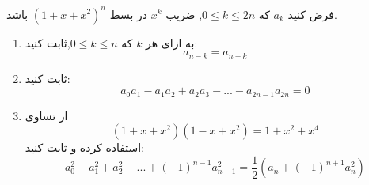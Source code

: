     \p
    فرض کنید 
	$a_k$
	كه
	$0 \leq k \leq 2n$,
	 ضریب 
	 $x^k$ در بسط $(1 + x + x^2)^n$ باشد.
	\begin{enumerate}
        \item
    	به ازای هر $k$
		كه
		$0 \leq k \leq n$,ثابت کنید:
		 $$a_{n-k} = a_{n+k}$$
    	\item
    	ثابت کنید:
        $$a_0a_1 - a_1a_2 + a_2a_3 - ... - a_{2n-1}a_{2n} = 0$$
    	\item
    	از تساوی
    	$$(1 + x + x^2)(1 - x + x^2) = 1 + x^2 + x^4$$
    	استفاده کرده و ثابت کنید:
    	$$a_0^2 - a_1^2 + a_2^2 - ... + (-1)^{n - 1}a_{n - 1}^2 = \frac{1}{2}(a_n + (-1)^{n + 1}a_n^2)$$
    	
	\end{enumerate}
